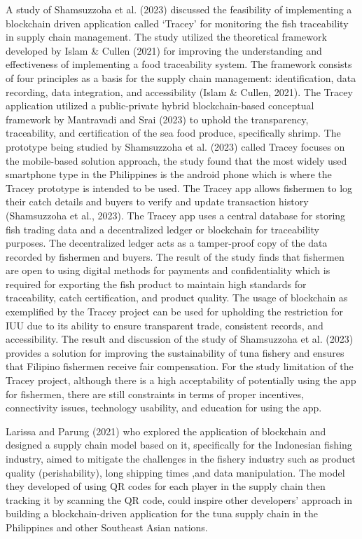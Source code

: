 A study of Shamsuzzoha et al.  (2023) discussed the feasibility of implementing a blockchain driven application called ‘Tracey’ for monitoring the fish traceability in supply chain management. The study utilized the theoretical framework developed by Islam \& Cullen (2021) for improving the understanding and effectiveness of implementing a food traceability system. The framework consists of four principles as a basis for the supply chain management: identification, data recording, data integration, and accessibility (Islam \& Cullen, 2021). The Tracey application utilized a public-private hybrid blockchain-based conceptual framework by Mantravadi and Srai (2023) to uphold the transparency, traceability, and certification of the sea food produce, specifically shrimp. The prototype being studied by Shamsuzzoha et al. (2023) called Tracey focuses on the mobile-based solution approach, the study found that the most widely used smartphone type in the Philippines is the android phone which is where the Tracey prototype is intended to be used. The Tracey app allows fishermen to log their catch details and buyers to verify and update transaction history (Shamsuzzoha et al., 2023). The Tracey app uses a central database for storing fish trading data and a decentralized ledger or blockchain for traceability purposes. The decentralized ledger acts as a tamper-proof copy of the data recorded by fishermen and buyers. The result of the study finds that fishermen are open to using digital methods for payments and confidentiality which is required for exporting the fish product to maintain high standards for traceability, catch certification, and product quality. The usage of blockchain as exemplified by the Tracey project can be used for upholding the restriction for IUU due to its ability to ensure transparent trade, consistent records, and accessibility. The result and discussion of the study of Shamsuzzoha et al. (2023) provides a solution for improving the sustainability of tuna fishery and ensures that Filipino fishermen receive fair compensation. For the study limitation of the Tracey project, although there is a high acceptability of potentially using the app for fishermen, there are still constraints in terms of proper incentives, connectivity issues, technology usability, and education for using the app.

Larissa and Parung (2021) who explored the application of blockchain and designed a supply chain model based on it, specifically for the Indonesian fishing industry, aimed to mitigate the challenges in the fishery industry such as product quality (perishability), long shipping times ,and data manipulation. The model they developed of using QR codes for each player in the supply chain then tracking it by scanning the QR code, could inspire other developers' approach in building a blockchain-driven application for the tuna supply chain in the Philippines and other Southeast Asian nations.

